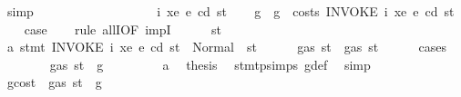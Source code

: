 \begin{isabellebody}
\ simp\isanewline
\ \ \ \ \ \ \isamarkupfalse%
\isanewline
\ \ \ \ \isamarkupfalse%
\isanewline
\ \ \isamarkupfalse%
\isanewline
{}\isamarkupfalse%
\isanewline
\ \ \isamarkupfalse%
\ {\isacharparenleft}{\kern0pt}{}\ i\ xe\ e\ cd\ st{\isacharparenright}{\kern0pt}\isanewline
\ \ \isamarkupfalse%
\ g\ \ {\isachardoublequoteopen}g\ {\isacharequal}{\kern0pt}\ costs\ {\isacharparenleft}{\kern0pt}INVOKE\ i\ xe{\isacharparenright}{\kern0pt}\ e\ cd\ st{\isachardoublequoteclose}\isanewline
\ \ \isamarkupfalse%
\ {\isacharquery}{\kern0pt}case\isanewline
\ \ \isamarkupfalse%
\ {\isacharparenleft}{\kern0pt}rule\ allI{\isacharbrackleft}{\kern0pt}OF\ impI{\isacharbrackright}{\kern0pt}{\isacharparenright}{\kern0pt}\isanewline
\ \ \ \ \isamarkupfalse%
\ st{}{\isacharprime}{\kern0pt}\ \isamarkupfalse%
\ a{}{\isacharcolon}{\kern0pt}\ {\isachardoublequoteopen}stmt\ {\isacharparenleft}{\kern0pt}INVOKE\ i\ xe{\isacharparenright}{\kern0pt}\ e\ cd\ st\ {\isacharequal}{\kern0pt}\ Normal\ {\isacharparenleft}{\kern0pt}{\isacharparenleft}{\kern0pt}{\isacharparenright}{\kern0pt}{\isacharcomma}{\kern0pt}\ st{}{\isacharprime}{\kern0pt}{\isacharparenright}{\kern0pt}{\isachardoublequoteclose}\isanewline
\ \ \ \ \isamarkupfalse%
\ {\isachardoublequoteopen}gas\ st{}{\isacharprime}{\kern0pt}\ {\isasymle}\ gas\ st{\isachardoublequoteclose}\isanewline
\ \ \ \ \isamarkupfalse%
\ {\isacharparenleft}{\kern0pt}cases{\isacharparenright}{\kern0pt}\isanewline
\ \ \ \ \ \ \isamarkupfalse%
\ {\isachardoublequoteopen}gas\ st\ {\isasymle}\ g{\isachardoublequoteclose}\isanewline
\ \ \ \ \ \ \isamarkupfalse%
\ {}{\isacharparenleft}{\kern0pt}{}{\isacharparenright}{\kern0pt}\ a{}\ \isamarkupfalse%
\ {\isacharquery}{\kern0pt}thesis\ \isamarkupfalse%
\ stmt{\isachardot}{\kern0pt}psimps{\isacharparenleft}{\kern0pt}{}{\isacharparenright}{\kern0pt}\ g{\isacharunderscore}{\kern0pt}def\ \isamarkupfalse%
\ simp\isanewline
\ \ \ \ \isamarkupfalse%
\isanewline
\ \ \ \ \ \ \isamarkupfalse%
\ gcost{\isacharcolon}{\kern0pt}\ {\isachardoublequoteopen}{\isasymnot}\ gas\ st\ {\isasymle}\ g{\isachardoublequoteclose}\isanewline
\ \ \ \ \ \ \isamarkupfalse%
\ \isamarkupfalse%

\end{isabellebody}
